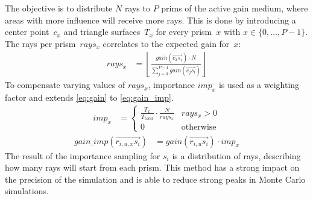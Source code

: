 The objective is to distribute $N$ rays to $P$ prims of the active gain
medium, where areas with more influence will receive more rays.  This
is done by introducing a center point~$c_x$ and triangle
surfaces~$T_x$ for every prism~$x$ with $x \in \{0,\dots,P-1\}$.  The
rays per prism~$rays_x$ correlates to the expected gain for~$x$:
\begin{align}
  rays_x &= \left\lfloor\frac{gain(\overrightarrow{c_xs_i}) \cdot
    N}{\sum^{P-1}_{j=0} gain(\overrightarrow{c_js_i})}\right\rfloor
\end{align}
To compensate varying values of $rays_x$, importance $imp_x$ is used
as a weighting factor and extends \eqref{eq:gain} to
\eqref{eq:gain_imp}.
\begin{align}
imp_x &=
\begin{cases}
\frac{T_x}{T_{total}} \cdot \frac{N}{rays_x} &rays_x > 0\\ 0
&\text{otherwise}
\end{cases}
\end{align}
\begin{align}
\label{eq:gain_imp}
gain\_imp(\overrightarrow{r_{i,u,x}s_i}) &=
gain(\overrightarrow{r_{i,u}s_i}) \cdot imp_x
\end{align}
The result of the importance sampling for $s_i$ is a distribution of
rays, describing how many rays will start from each prism.  This
method has a strong impact on the precision of the simulation and is
able to reduce strong peaks in Monte Carlo simulations.


